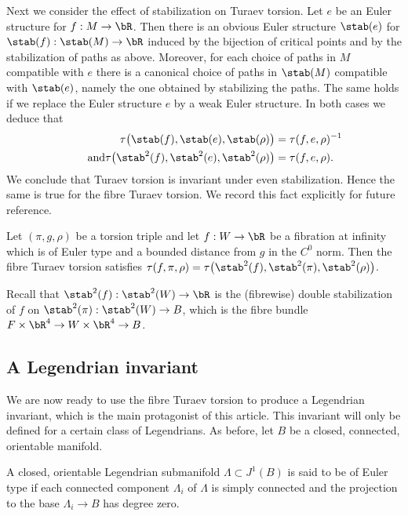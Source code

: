 Next we consider the effect of stabilization on Turaev torsion. Let $e$ be an Euler structure for $f:M \to \bR$. Then there is an obvious Euler structure $\stab (e)$ for $\stab (f) : \stab (M) \to \bR$ induced by the bijection of critical points and by the stabilization of paths as above. Moreover, for each choice of paths in $M$ compatible with $e$ there is a canonical choice of paths in $\stab (M)$ compatible with $\stab (e)$, namely the one obtained by stabilizing the paths. The same holds if we replace the Euler structure $e$ by a weak Euler structure. In both cases we deduce that
\begin{align*}
\tau\big(\stab (f), \stab (e), \stab (\rho) \big) &= \tau(f,e,\rho)^{-1} \\ \tag*{and} \tau\big(\stab ^2(f), \stab ^2(e), \stab ^2(\rho) \big) &= \tau(f,e, \rho).
\end{align*}
We conclude that Turaev torsion is invariant under even stabilization. Hence the same is true for the fibre Turaev torsion. We record this fact explicitly for future reference.

\begin{proposition}\label{Proposition: turaev stability} Let $(\pi,g,\rho)$ be a torsion triple and let $f:W \to \bR$ be a fibration at infinity which is of Euler type and a bounded distance from $g$ in the $C^0$ norm. Then the fibre Turaev torsion satisfies $\tau(f, \pi, \rho) = \tau\big( \stab ^2(f), \stab ^2(\pi), \stab ^2(\rho) \big)$.
\end{proposition}

\begin{remark} Recall that $\stab ^2(f) : \stab ^2(W) \to \bR$ is the (fibrewise) double stabilization of $f$ on $\stab ^2(\pi):\stab ^2(W) \to B$, which is the fibre bundle $F \times \bR^4 \to W \times \bR^4 \to B$. \end{remark}

\subsection{A Legendrian invariant}\label{sec: invariant}

We are now ready to use the fibre Turaev torsion to produce a Legendrian invariant, which is the main protagonist of this article. This invariant will only be defined for a certain class of Legendrians. As before, let $B$ be a closed, connected, orientable manifold.

\begin{definition}
A closed, orientable Legendrian submanifold $\Lambda \subset J^1(B)$ is said to be of Euler type if each connected component $\Lambda_i$ of $\Lambda$ is simply connected and the projection to the base $\Lambda_i \to B$ has degree zero. \end{definition}

